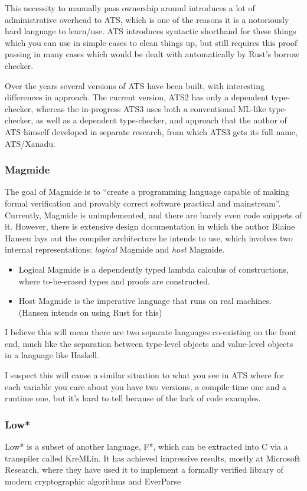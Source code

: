 \documentclass[12pt,twoside]{report}
\begin{document}
This necessity to manually pass ownership around introduces a lot of administrative overhead to ATS, which is one of the reasons it is a notoriously hard language to learn/use. ATS introduces syntactic shorthand for these things which you can use in simple cases to clean things up, but still requires this proof passing in many cases which would be dealt with automatically by Rust's borrow checker.

Over the years several versions of ATS have been built, with interesting differences in approach. The current version, ATS2 has only a dependent type-checker, whereas the in-progress ATS3 uses both a conventional ML-like type-checker, as well as a dependent type-checker, and approach that the author of ATS himself developed in separate research, from which ATS3 gets its full name, ATS/Xanadu.

\subsubsection{Magmide}
The goal of Magmide \cite{noauthor_magmidemagmide_2024} is to ``create a programming language capable of making formal verification and provably correct software practical and mainstream''. Currently, Magmide is unimplemented, and there are barely even code snippets of it. However, there is extensive design documentation in which the author Blaine Hansen lays out the compiler architecture he intends to use, which involves two internal representations: \textit{logical} Magmide and \textit{host} Magmide.

\begin{itemize}
  \item Logical Magmide is a dependently typed lambda calculus of constructions, where to-be-erased types and proofs are constructed.
  \item Host Magmide is the imperative language that runs on real machines. (Hansen intends on using Rust for this)
\end{itemize}

I believe this will mean there are two separate languages co-existing on the front end, much like the separation between type-level objects and value-level objects in a language like Haskell.

I suspect this will cause a similar situation to what you see in ATS where for each variable you care about you have two versions, a compile-time one and a runtime one, but it's hard to tell because of the lack of code examples.

\subsubsection{Low*}
Low*\cite{protzenko_low_2017} is a subset of another language, F*, which can be extracted into C via a transpiler called KreMLin. It has achieved impressive results, mostly at Microsoft Research, where they have used it to implement a formally verified library of modern cryptographic algorithms\cite{star_2024} and EverParse
\end{document}
